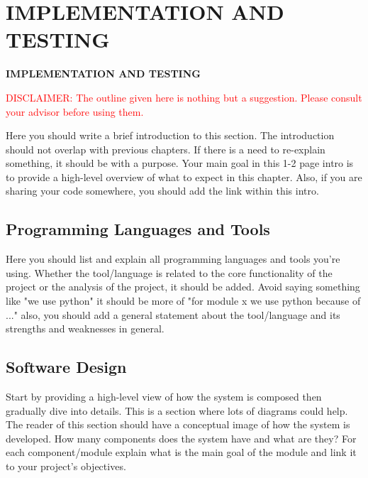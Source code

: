 \chapter{IMPLEMENTATION AND TESTING}
\pagebreak


\begin{center}
{\LARGE\textbf{IMPLEMENTATION AND TESTING}}
\end{center}

\textcolor{red}{DISCLAIMER: The outline given here is nothing but a suggestion. Please consult your advisor before using them.}

Here you should write a brief introduction to this section. The introduction should not overlap with previous chapters. If there is a need to re-explain something, it should be with a purpose. Your main goal in this 1-2 page intro is to provide a high-level overview of what to expect in this chapter. Also, if you are sharing your code somewhere, you should add the link within this intro.
    
\section{Programming Languages and Tools} %
\label{sec:programming-languages-and-tools}

Here you should list and explain all programming languages and tools you're using. Whether the tool/language is related to the core functionality of the project or the analysis of the project, it should be added. Avoid saying something like "we use python" it should be more of "for module x we use python because of ..." also, you should add a general statement about the tool/language and its strengths and weaknesses in general.


\section{Software Design}%
\label{sec:software-design}

Start by providing a high-level view of how the system is composed then gradually dive into details. This is a section where lots of diagrams could help. The reader of this section should have a conceptual image of how the system is developed. How many components does the system have and what are they? For each component/module explain what is the main goal of the module and link it to your project's objectives.

